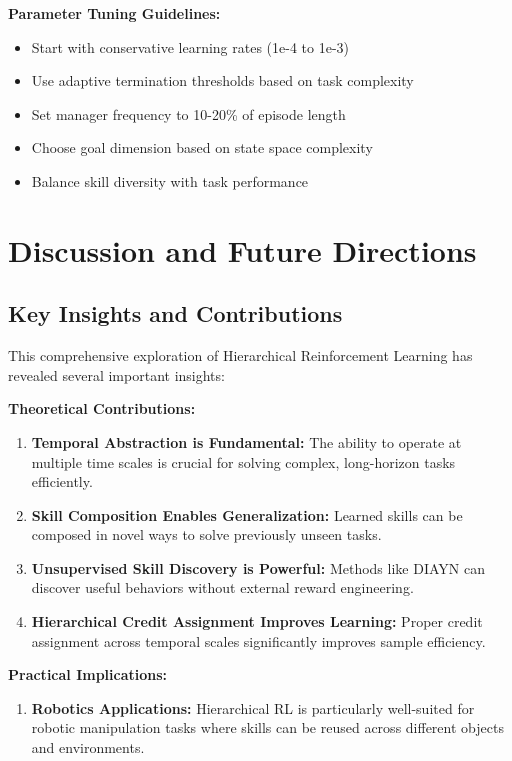 \documentclass[12pt]{article}
\begin{document}
{{\textbf{Parameter Tuning Guidelines:}
\begin{itemize}
    \item Start with conservative learning rates (1e-4 to 1e-3)
    \item Use adaptive termination thresholds based on task complexity
    \item Set manager frequency to 10-20\% of episode length
    \item Choose goal dimension based on state space complexity
    \item Balance skill diversity with task performance
\end{itemize}

\section{Discussion and Future Directions}

\subsection{Key Insights and Contributions}

This comprehensive exploration of Hierarchical Reinforcement Learning has revealed several important insights:

\textbf{Theoretical Contributions:}
\begin{enumerate}
    \item \textbf{Temporal Abstraction is Fundamental:} The ability to operate at multiple time scales is crucial for solving complex, long-horizon tasks efficiently.
    
    \item \textbf{Skill Composition Enables Generalization:} Learned skills can be composed in novel ways to solve previously unseen tasks.
    
    \item \textbf{Unsupervised Skill Discovery is Powerful:} Methods like DIAYN can discover useful behaviors without external reward engineering.
    
    \item \textbf{Hierarchical Credit Assignment Improves Learning:} Proper credit assignment across temporal scales significantly improves sample efficiency.
\end{enumerate}

\textbf{Practical Implications:}
\begin{enumerate}
    \item \textbf{Robotics Applications:} Hierarchical RL is particularly well-suited for robotic manipulation tasks where skills can be reused across different objects and environments.
    

\end{enumerate}}}
\end{document}
